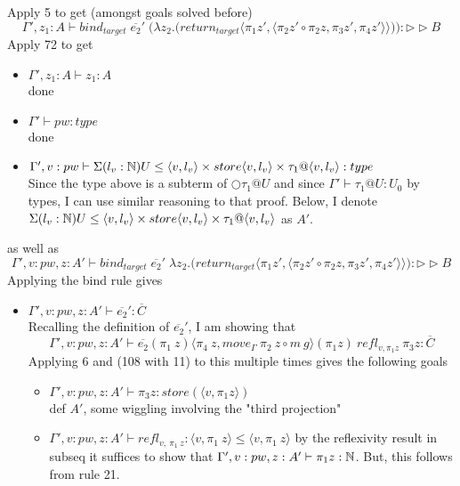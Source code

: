 \documentclass{article}
\begin{document}
\begin{itemize}
\begin{itemize}
Apply 5 to get (amongst goals solved before)
\[\Gamma', z_1: A  \vdash bind_{target} \; \overline{e_2}'
\; \big(\lambda z_2. \big(return_{target}\langle \pi_1 z', \langle \pi_2 z' \circ \pi_2 z, \pi_3 z', \pi_4 z' \rangle \rangle \big)\big) : \rhd \rhd B\]
Apply 72 to get
\begin{itemize}
    \item $\Gamma', z_1: A \vdash z_1 : A$\\
done
    \item $\Gamma' \vdash pw: type$\\
    done
    \item $\Gamma', v: pw \vdash \Sigma(l_v : \mathbb{N})U \leq \langle v, l_v\rangle \times store\langle v, l_v\rangle \times \tau_1@\langle v, l_v\rangle : type$\\
    Since the type above is a subterm of $\bigcirc \tau_1 @ U$ and since $\Gamma' \vdash \tau_1 @ U : U_0$ by types, I can use similar reasoning to that proof. Below, I denote
 $\Sigma(l_v : \mathbb{N})U \leq \langle v, l_v\rangle \times store\langle v, l_v\rangle \times \tau_1@\langle v, l_v\rangle$ as $A'$.
 \end{itemize}
as well as \[\Gamma', v: pw, z:A'  \vdash  bind_{target} \; \overline{e_2}'
\; \lambda z_2. \big(return_{target}\langle \pi_1 z', \langle \pi_2 z' \circ \pi_2 z, \pi_3 z', \pi_4 z' \rangle \rangle \big) : \rhd \rhd B\]
Applying the bind rule gives 
\begin{itemize}
    \item $\Gamma', v: pw, z:A'  \vdash \overline{e_2}' : \overline{C}$\\
    Recalling the definition of $\overline{e_2}'$, I am showing that 
    \[\Gamma', v: pw, z:A'  \vdash   \overline{e_2} (\pi_1 \: z)
\langle \pi_4 \: z, move_\Gamma \: \pi_2 \: z \circ m \: g \rangle (\pi_1 z) \: refl_{v, \pi_1 z} \: \pi_3 z : \overline{C}\]
    Applying 6 and (108 with 11) to this multiple times gives the following goals 
    \begin{itemize}
        \item $\Gamma', v: pw, z:A'  \vdash \pi_3 z : store(\langle v, \pi_1 z \rangle)$\\
        def $A'$, some wiggling involving the "third projection"
        \item $\Gamma', v: pw, z:A'  \vdash refl_{v, \: \pi_1 \: z} : \langle v, \pi_1 \: z \rangle \leq \langle v, \pi_1 \: z \rangle $
        by the reflexivity result in subseq it suffices to show that $\Gamma', v: pw, z:A' \vdash \pi_1 z : \mathbb{N}$. But, this follows from rule 21.

\end{itemize}
\end{itemize}
\end{itemize}
\end{itemize}
\end{document}
